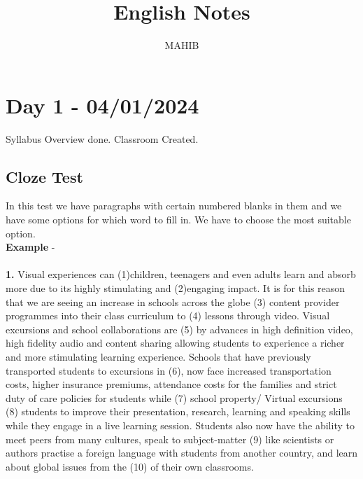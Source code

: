 \documentclass[a4paper,30pt]{report}
\title{\Huge{\textbf{English Notes}}}
\author{MAHIB}
\begin{document}
  \maketitle\date{}\newpage
  \tableofcontents\newpage
  
  \chapter{Day 1 - 04/01/2024}
    Syllabus Overview done. Classroom Created. 
    
    \section{Cloze Test}
      In this test we have paragraphs with certain numbered blanks in them and we have some options for which word to fill in. We have to choose the most suitable option.\\

      \textbf{Example} -\\\\ \textbf{1.} Visual experiences can (1)children, teenagers and even
adults learn and absorb more due to its highly
stimulating and (2)engaging impact. It is for this
reason that we are seeing an increase in schools across
the globe (3) content provider programmes into their
class curriculum to (4) lessons through video. Visual
excursions and school collaborations are (5) by
advances in high definition video, high fidelity audio
and content sharing allowing students to experience a
richer and more stimulating learning experience.
Schools that have previously transported
students to excursions in (6), now face increased
transportation costs, higher insurance premiums,
attendance costs for the families and strict duty of care
policies for students while (7) school property/ Virtual
excursions (8) students to improve their presentation,
research, learning and speaking skills while they
engage in a live learning session. Students also now
have the ability to meet peers from many cultures,
speak to subject-matter (9) like scientists or authors
practise a foreign language with students from another
country, and learn about global issues from the (10) of
their own classrooms.\\\\
\end{document}
